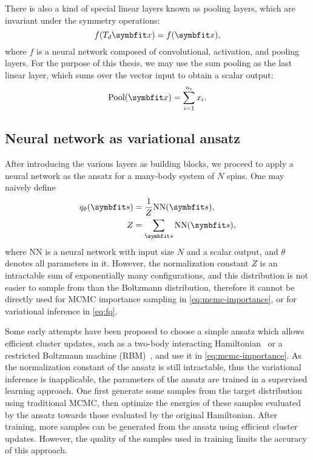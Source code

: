 There is also a kind of special linear layers known as pooling layers, which are invariant under the symmetry operations:
\begin{equation}
f(T_d \vx) = f(\vx),
\label{eq:trans-invar}
\end{equation}
where $f$ is a neural network composed of convolutional, activation, and pooling layers. For the purpose of this thesis, we may use the sum pooling as the last linear layer, which sums over the vector input to obtain a scalar output:
\begin{equation}
\text{Pool}(\vx) = \sum_{i = 1}^{n_\text{s}} x_i.
\end{equation}

\subsection{Neural network as variational ansatz}

After introducing the various layers as building blocks, we proceed to apply a neural network as the ansatz for a many-body system of $N$ spins. One may naively define
\begin{align}
q_\theta(\vs) &= \frac{1}{Z} \text{NN}(\vs), \\
Z &= \sum_\vs \text{NN}(\vs),
\end{align}
where NN is a neural network with input size $N$ and a scalar output, and $\theta$ denotes all parameters in it. However, the normalization constant $Z$ is an intractable sum of exponentially many configurations, and this distribution is not easier to sample from than the Boltzmann distribution, therefore it cannot be directly used for MCMC importance sampling in \cref{eq:mcmc-importance}, or for variational inference in \cref{eq:fq}.

Some early attempts have been proposed to choose a simple ansatz which allows efficient cluster updates, such as a two-body interacting Hamiltonian~\cite{liu2017self} or a restricted Boltzmann machine (RBM)~\cite{huang2017accelerated}, and use it in \cref{eq:mcmc-importance}. As the normalization constant of the ansatz is still intractable, thus the variational inference is inapplicable, the parameters of the ansatz are trained in a supervised learning approach. One first generate some samples from the target distribution using traditional MCMC, then optimize the energies of these samples evaluated by the ansatz towards those evaluated by the original Hamiltonian. After training, more samples can be generated from the ansatz using efficient cluster updates. However, the quality of the samples used in training limits the accuracy of this approach.

